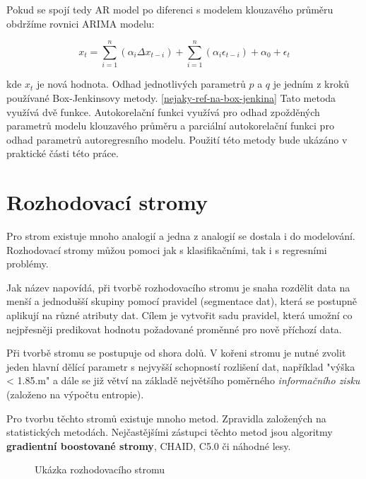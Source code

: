 \documentclass[FM,BP,fonts]{tulthesis}
\begin{document}
Pokud se spojí tedy AR model po diferenci s modelem klouzavého průměru obdržíme rovnici ARIMA modelu: 

\begin{equation}
 x_t =    \sum_{i=1}^{n}(\alpha_i \Delta x_{t-i}) + \sum_{i=1}^{n}(\alpha_i\epsilon_{t-i}) + \alpha_0 + \epsilon_t
\end{equation}

kde $x_t$ je nová hodnota. Odhad jednotlivých parametrů $p$ a $q$ je jedním z kroků používané Box-Jenkinsovy metody. \ref{nejaky-ref-na-box-jenkina} Tato metoda využívá dvě funkce. Autokorelační funkci využívá pro odhad zpožděných parametrů modelu klouzavého průměru a parciální autokorelační funkci pro odhad parametrů autoregresního modelu. Použití této metody bude ukázáno v praktické části této práce.



 
\newpage
\section{Rozhodovací stromy}
Pro strom existuje mnoho analogií a jedna z analogií se dostala i do modelování. Rozhodovací stromy můžou pomoci jak s klasifikačními, tak i s regresními problémy. 

Jak název napovídá, při tvorbě rozhodovacího stromu je snaha rozdělit data na menší a jednodušší skupiny pomocí pravidel (segmentace dat), která se postupně aplikují na různé atributy dat. Cílem je vytvořit sadu pravidel, která umožní co nejpřesněji predikovat hodnotu požadované proměnné pro nově příchozí data.

Při tvorbě stromu se postupuje od shora dolů. V kořeni stromu je nutné zvolit jeden hlavní dělící parametr s nejvyšší schopností rozlišení dat, například "výška < 1.85.m" a dále se již větví na základě největšího poměrného \textit{informačního zisku} (založeno na výpočtu entropie).  \cite{Tomsik2016thesis}

Pro tvorbu těchto stromů existuje mnoho metod. Zpravidla založených na statistických metodách. Nejčastějšími zástupci těchto metod jsou algoritmy \textbf{gradientní boostované stromy}, CHAID, C5.0 či náhodné lesy. \cite{Tomsik2016thesis}

\begin{figure}[htbp]
	\centering
	\caption{Ukázka rozhodovacího stromu}
	\label{fig:my_graph}
\end{figure}
\end{document}
